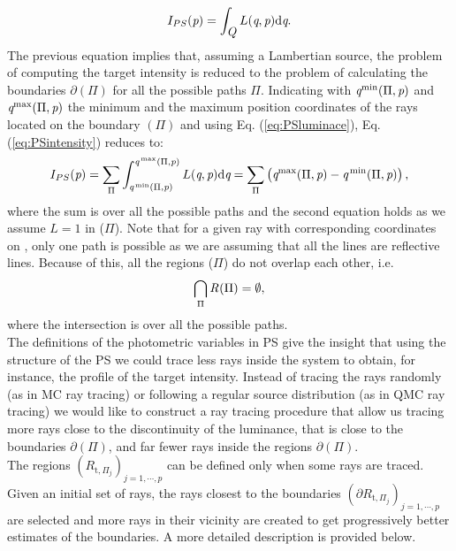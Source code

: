 \begin{equation}
\label{eq:PSintensity}
I_{PS}(\textit{p}) = \int_{\mbox{$\emph{Q}_{\textit{}}$}}L(\textit{q}, \textit{p}) \textrm{d}\textit{q}.
\end{equation}
The previous equation implies that, assuming a Lambertian source, the problem of computing the target intensity is reduced to the problem of calculating the boundaries 
$\partial$$(\Pi)$ for all the possible paths $\Pi$. Indicating with $\textit{q}^\textrm{min}(\Pi,\textit{p})$ and $\textit{q}^\textrm{max}(\Pi,\textit{p})$ the minimum and the maximum position coordinates of the rays located on the boundary $(\Pi)$ and using Eq. (\ref{eq:PSluminace}), Eq. (\ref{eq:PSintensity}) reduces to:
\begin{equation}\label{eta2}
I_{PS}(\textit{p}) = \sum_{\Pi}\int_{\textit{q}^\textrm{\,min}(\Pi, \textit{p})}^{\textit{q}^\textrm{\,max}(\Pi,\textit{p})}L(\textit{q}, \textit{p})\textrm{d}\textit{q} = \sum_{\Pi}\big (\textit{q}^\textrm{max}(\Pi,\textit{p})-\textit{q}^\textrm{\,min}(\Pi,\textit{p})\big )\,,
\end{equation}
where the sum is over all the possible paths and the second equation holds as we assume $L=1$ in ($\Pi$). 
Note that for a given ray with corresponding coordinates 
on , only one path is possible as we are assuming that all the lines are reflective lines.
Because of this, all the regions ($\Pi$) do not overlap each other, i.e. 
\begin{equation}
\bigcap_{\Pi}\mbox{$\emph{R}_{\textit{}}$}(\Pi)= \emptyset,
\end{equation}
where the intersection is over all the possible paths. \\ \indent
The definitions of the photometric variables in PS give the insight that using the structure of the PS we could trace less rays inside the system to obtain, for instance, the profile of the target intensity. Instead of tracing the rays randomly (as in MC ray tracing) or following a regular source distribution (as in QMC ray tracing) we would like to construct a ray tracing procedure that allow us tracing more rays close to the discontinuity of the luminance, that is close to the boundaries $\partial$$(\Pi)$, and far fewer rays inside the regions $\partial$$(\Pi)$. \\ \indent
The regions $(R_{\textrm{t}, \Pi_j})_{j =1, \cdots, p}$ can be defined only when some rays are traced.
Given an initial set of rays, the rays closest to the boundaries $(\partial R_{\textrm{t}, \Pi_j})_{j = 1, \cdots, p}$ are selected and more rays in their vicinity are created to get progressively better estimates of the boundaries. A more detailed description is provided below.
